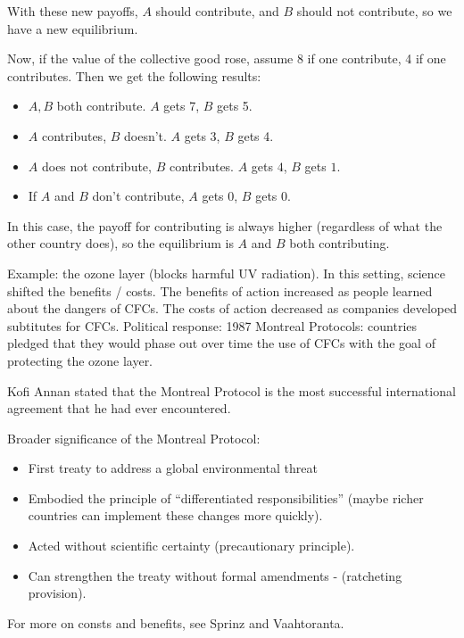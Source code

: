 \documentclass{article}
\begin{document}
  With these new payoffs, $A$ should contribute, and $B$ should not contribute, so we have a new equilibrium.

  Now, if the value of the collective good rose, assume 8 if one contribute, 4 if one contributes.  Then we get the following results:

  \begin{itemize}
    \item $A, B$ both contribute.  $A$ gets 7, $B$ gets 5.
    \item $A$ contributes, $B$ doesn't. $A$ gets 3, $B$ gets 4.
    \item $A$ does not contribute, $B$ contributes.  $A$ gets $4$, $B$ gets $1$.
    \item If $A$ and $B$ don't contribute, $A$ gets 0, $B$ gets 0.
  \end{itemize}

  In this case, the payoff for contributing is always higher (regardless of what the other country does), so the equilibrium is $A$ and $B$ both contributing.

  Example: the ozone layer (blocks harmful UV radiation).  In this setting, science shifted the benefits / costs.  The benefits of action increased as people learned about the dangers of CFCs.  The costs of action decreased as companies developed subtitutes for CFCs.  Political response: 1987 Montreal Protocols: countries pledged that they would phase out over time the use of CFCs with the goal of protecting the ozone layer.

  Kofi Annan stated that the Montreal Protocol is the most successful international agreement that he had ever encountered.

  Broader significance of the Montreal Protocol:

  \begin{itemize}
    \item First treaty to address a global environmental threat
    \item Embodied the principle of ``differentiated responsibilities'' (maybe richer countries can implement these changes more quickly).
    \item Acted without scientific certainty (precautionary principle).
    \item Can strengthen the treaty without formal amendments - (ratcheting provision).
  \end{itemize}

  For more on consts and benefits, see Sprinz and Vaahtoranta.
\end{document}
